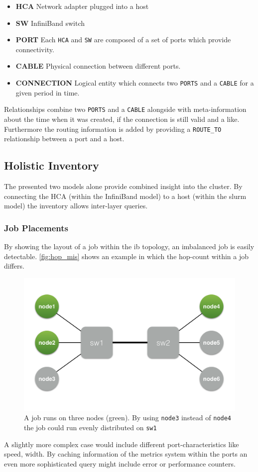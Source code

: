 \begin{itemize}
    \item \textbf{HCA} Network adapter plugged into a host
    \item \textbf{SW} InfiniBand switch
    \item \textbf{PORT} Each \lstinline{HCA} and \lstinline{SW} are composed of a set of ports which provide connectivity.
    \item \textbf{CABLE} Physical connection between different ports.
    \item \textbf{CONNECTION} Logical entity which connects two \lstinline{PORTS} and a \lstinline{CABLE} for a given period in time.
\end{itemize}

Relationships combine two \lstinline{PORTS} and a \lstinline{CABLE} alongside with meta-information about the time when it was created, if the connection is still valid and a like.
Furthermore the routing information is added by providing a \lstinline{ROUTE_TO} relationship between a port and a host.

\subsection{Holistic Inventory}
The presented two models alone provide combined insight into the cluster. By connecting the HCA (within the InfiniBand model) to a host (within the \gls{slurm} model) the inventory allows inter-layer queries.

\subsubsection{Job Placements}
By showing the layout of a job within the \gls{ib} topology, an imbalanced job is easily detectable. \autoref{fig:hop_mis} shows an example in which the hop-count within a job differs.
\begin{figure}[!ht]
    \includegraphics[width=.4\textwidth]{images/png/hop_missmatch.png}
    \caption{\label{fig:hop_mis}A job runs on three nodes (green). By using \lstinline{node3} instead of \lstinline{node4} the job could run evenly distributed on \lstinline{sw1}}
\end{figure}
A slightly more complex case would include different port-characteristics like speed, width.
By caching information of the metrics system within the ports an even more sophisticated query might include error or performance counters.

